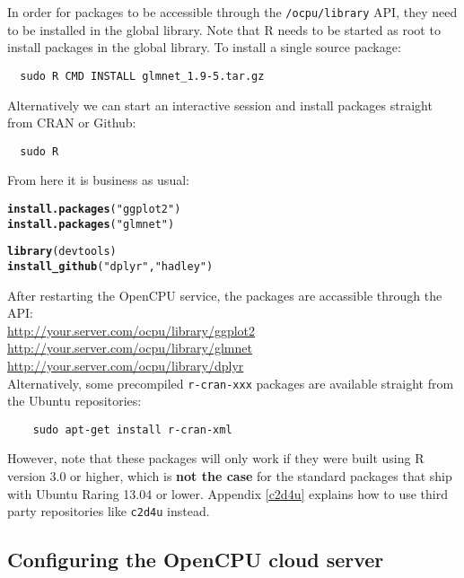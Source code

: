 \documentclass{scrartcl}\usepackage[]{graphicx}\usepackage[]{color}
\makeatletter
\newcommand{\hlstr}[1]{\textcolor[rgb]{0.192,0.494,0.8}{#1}}%
\newcommand{\hlstd}[1]{\textcolor[rgb]{0.345,0.345,0.345}{#1}}%
\newcommand{\hlkwd}[1]{\textcolor[rgb]{0.737,0.353,0.396}{\textbf{#1}}}%
\newenvironment{kframe}{%
 \def\at@end@of@kframe{}%
 \ifinner\ifhmode%
  \def\at@end@of@kframe{\end{minipage}}%
  \begin{minipage}{\columnwidth}%
 \fi\fi%
 \def\FrameCommand##1{\hskip\@totalleftmargin \hskip-\fboxsep
 \colorbox{shadecolor}{##1}\hskip-\fboxsep
     \hskip-\linewidth \hskip-\@totalleftmargin \hskip\columnwidth}%
 \MakeFramed {\advance\hsize-\width
   \@totalleftmargin\z@ \linewidth\hsize
   \@setminipage}}%
 {\par\unskip\endMakeFramed%
 \at@end@of@kframe}
\newenvironment{knitrout}{}{} %
\makeatother
\begin{document}
In order for packages to be accessible through the \texttt{/ocpu/library} API, they need to be installed in the global library. Note that R needs to be started as root to install packages in the global library. To install a single source package:
\begin{verbatim}
  sudo R CMD INSTALL glmnet_1.9-5.tar.gz
\end{verbatim}
Alternatively we can start an interactive session and install packages straight from CRAN or Github:
\begin{verbatim}
  sudo R
\end{verbatim}
From here it is business as usual:
\begin{knitrout}
\color{fgcolor}\begin{kframe}
\begin{alltt}
\hlkwd{install.packages}\hlstd{(}\hlstr{"ggplot2"}\hlstd{)}
\hlkwd{install.packages}\hlstd{(}\hlstr{"glmnet"}\hlstd{)}

\hlkwd{library}\hlstd{(devtools)}
\hlkwd{install_github}\hlstd{(}\hlstr{"dplyr"}\hlstd{,} \hlstr{"hadley"}\hlstd{)}
\end{alltt}
\end{kframe}
\end{knitrout}

\noindent After restarting the OpenCPU service, the packages are accassible through the API:\\

\indent \url{http://your.server.com/ocpu/library/ggplot2} \\
\indent \url{http://your.server.com/ocpu/library/glmnet} \\
\indent \url{http://your.server.com/ocpu/library/dplyr} \\

\noindent Alternatively, some precompiled \texttt{r-cran-xxx} packages are available straight from the Ubuntu repositories:
\begin{verbatim}
    sudo apt-get install r-cran-xml
\end{verbatim}
However, note that these packages will only work if they were built using R version 3.0 or higher, which is \textbf{not the case} for the standard packages that ship with Ubuntu Raring 13.04 or lower. Appendix \ref{c2d4u} explains how to use third party repositories like \texttt{c2d4u} instead.

\subsection{Configuring the OpenCPU cloud server}
\end{document}
